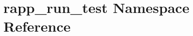 \hypertarget{namespacerapp__run__test}{\section{rapp\-\_\-run\-\_\-test Namespace Reference}
\label{namespacerapp__run__test}
}
